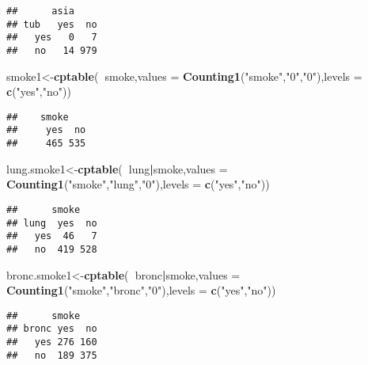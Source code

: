 \documentclass[
]{article}
\newenvironment{Shaded}{\begin{snugshade}}{\end{snugshade}}
\newcommand{\DataTypeTok}[1]{\textcolor[rgb]{0.13,0.29,0.53}{#1}}
\newcommand{\KeywordTok}[1]{\textcolor[rgb]{0.13,0.29,0.53}{\textbf{#1}}}
\newcommand{\NormalTok}[1]{#1}
\newcommand{\OperatorTok}[1]{\textcolor[rgb]{0.81,0.36,0.00}{\textbf{#1}}}
\newcommand{\StringTok}[1]{\textcolor[rgb]{0.31,0.60,0.02}{#1}}
\begin{document}
\begin{verbatim}
##      asia
## tub   yes  no
##   yes   0   7
##   no   14 979
\end{verbatim}

\begin{Shaded}
\begin{Highlighting}[]
\NormalTok{smoke1<-}\KeywordTok{cptable}\NormalTok{(}\OperatorTok{~}\NormalTok{smoke,}\DataTypeTok{values =} \KeywordTok{Counting1}\NormalTok{(}\StringTok{"smoke"}\NormalTok{,}\StringTok{"0"}\NormalTok{,}\StringTok{"0"}\NormalTok{),}\DataTypeTok{levels =} \KeywordTok{c}\NormalTok{(}\StringTok{"yes"}\NormalTok{,}\StringTok{"no"}\NormalTok{))}
\end{Highlighting}
\end{Shaded}

\begin{verbatim}
##    smoke
##     yes  no
##     465 535
\end{verbatim}

\begin{Shaded}
\begin{Highlighting}[]
\NormalTok{lung.smoke1<-}\KeywordTok{cptable}\NormalTok{(}\OperatorTok{~}\NormalTok{lung}\OperatorTok{|}\NormalTok{smoke,}\DataTypeTok{values =} \KeywordTok{Counting1}\NormalTok{(}\StringTok{"smoke"}\NormalTok{,}\StringTok{"lung"}\NormalTok{,}\StringTok{"0"}\NormalTok{),}\DataTypeTok{levels =} \KeywordTok{c}\NormalTok{(}\StringTok{"yes"}\NormalTok{,}\StringTok{"no"}\NormalTok{))}
\end{Highlighting}
\end{Shaded}

\begin{verbatim}
##      smoke
## lung  yes  no
##   yes  46   7
##   no  419 528
\end{verbatim}

\begin{Shaded}
\begin{Highlighting}[]
\NormalTok{bronc.smoke1<-}\KeywordTok{cptable}\NormalTok{(}\OperatorTok{~}\NormalTok{bronc}\OperatorTok{|}\NormalTok{smoke,}\DataTypeTok{values =} \KeywordTok{Counting1}\NormalTok{(}\StringTok{"smoke"}\NormalTok{,}\StringTok{"bronc"}\NormalTok{,}\StringTok{"0"}\NormalTok{),}\DataTypeTok{levels =} \KeywordTok{c}\NormalTok{(}\StringTok{"yes"}\NormalTok{,}\StringTok{"no"}\NormalTok{))}
\end{Highlighting}
\end{Shaded}

\begin{verbatim}
##      smoke
## bronc yes  no
##   yes 276 160
##   no  189 375
\end{verbatim}
\end{document}
